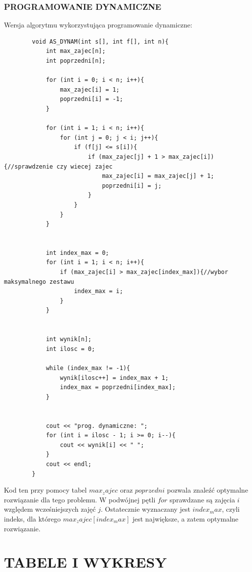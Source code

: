 \documentclass{article}
\begin{document}
	\subsubsection*{PROGRAMOWANIE DYNAMICZNE}
	Wersja algorytmu wykorzystująca programowanie dynamiczne:
	\begin{verbatim}
		void AS_DYNAM(int s[], int f[], int n){
			int max_zajec[n];  
			int poprzedni[n];  
			
			for (int i = 0; i < n; i++){
				max_zajec[i] = 1;
				poprzedni[i] = -1;
			}
			
			for (int i = 1; i < n; i++){
				for (int j = 0; j < i; j++){
					if (f[j] <= s[i]){
						if (max_zajec[j] + 1 > max_zajec[i]){//sprawdzenie czy wiecej zajec
							max_zajec[i] = max_zajec[j] + 1;
							poprzedni[i] = j;
						}
					}
				}
			}
			
			
			int index_max = 0;
			for (int i = 1; i < n; i++){
				if (max_zajec[i] > max_zajec[index_max]){//wybor maksymalnego zestawu
					index_max = i;
				}
			}
			
			
			int wynik[n];
			int ilosc = 0;
			
			while (index_max != -1){
				wynik[ilosc++] = index_max + 1;
				index_max = poprzedni[index_max];
			}
			
			
			cout << "prog. dynamiczne: ";
			for (int i = ilosc - 1; i >= 0; i--){
				cout << wynik[i] << " ";
			}
			cout << endl;
		}
	\end{verbatim}
	Kod ten przy pomocy tabel $max_zajec$ oraz $poprzedni$ pozwala znaleźć optymalne rozwiązanie dla tego problemu. W podwójnej pętli $for$ sprawdzane są zajęcia $i$ względem wcześniejszych zajęć $j$. Ostatecznie wyznaczany jest $index_max$, czyli indeks, dla którego $max_zajec[index_max]$ jest największe, a zatem optymalne rozwiązanie.
	\section*{TABELE I WYKRESY}
\end{document}
